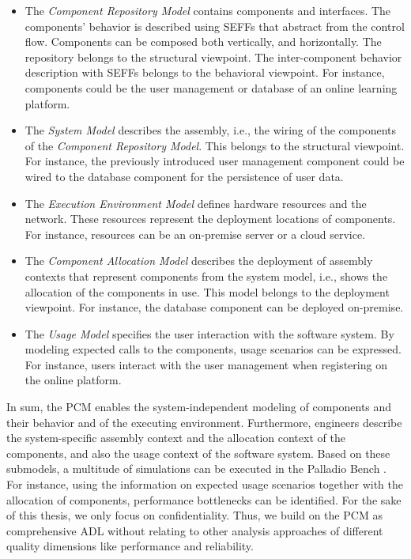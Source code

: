 \begin{itemize}
    \item The \emph{Component Repository Model} contains components and interfaces.
    The components' behavior is described using \acfp{SEFF} that abstract from the control flow.
    Components can be composed both vertically, and horizontally.
    The repository belongs to the structural viewpoint.
    The inter-component behavior description with \acp{SEFF} belongs to the behavioral viewpoint.
    For instance, components could be the user management or database of an online learning platform.
    \item The \emph{System Model} describes the assembly, i.e., the wiring of the components of the \emph{Component Repository Model}.
    This belongs to the structural viewpoint.
    For instance, the previously introduced user management component could be wired to the database component for the persistence of user data.
    \item The \emph{Execution Environment Model} defines hardware resources and the network.
    These resources represent the deployment locations of components.
    For instance, resources can be an on-premise server or a cloud service.
    \item The \emph{Component Allocation Model} describes the deployment of assembly contexts that represent components from the system model, i.e., shows the allocation of the components in use.
    This model belongs to the deployment viewpoint.
    For instance, the database component can be deployed on-premise.
    \item The \emph{Usage Model} specifies the user interaction with the software system.
    By modeling expected calls to the components, usage scenarios can be expressed.
    For instance, users interact with the user management when registering on the online platform.
\end{itemize}

In sum, the \ac{PCM} enables the system-independent modeling of components and their behavior and of the executing environment.
Furthermore, engineers describe the system-specific assembly context and the allocation context of the components, and also the usage context of the software system.
Based on these submodels, a multitude of simulations can be executed in the Palladio Bench \cite{reussner_palladio_2024}.
For instance, using the information on expected usage scenarios together with the allocation of components, performance bottlenecks can be identified.
For the sake of this thesis, we only focus on confidentiality.
Thus, we build on the \ac{PCM} as comprehensive \ac{ADL} without relating to other analysis approaches of different quality dimensions like performance and reliability.


